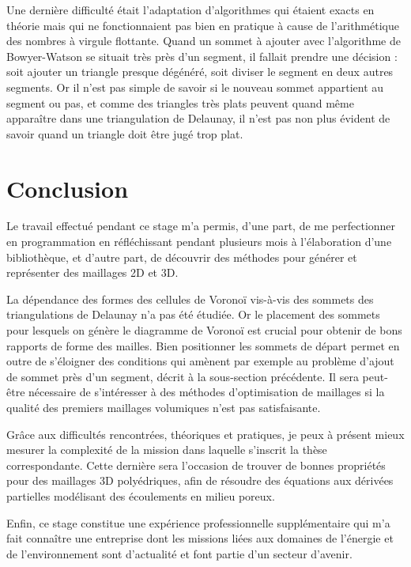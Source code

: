 \documentclass[12pt,a4paper]{report}
\begin{document}
Une dernière difficulté était l'adaptation d'algorithmes qui étaient exacts en théorie mais qui ne fonctionnaient pas bien en pratique à cause de l'arithmétique des nombres à virgule flottante. Quand un sommet à ajouter avec l'algorithme de Bowyer-Watson se situait très près d'un segment, il fallait prendre une décision : soit ajouter un triangle presque dégénéré, soit diviser le segment en deux autres segments. Or il n'est pas simple de savoir si le nouveau sommet appartient au segment ou pas, et comme des triangles très plats peuvent quand même apparaître dans une triangulation de Delaunay, il n'est pas non plus évident de savoir quand un triangle doit être jugé \og trop plat\fg{}.

\newpage
\section{Conclusion}

Le travail effectué pendant ce stage m'a permis, d'une part, de me perfectionner en programmation en réfléchissant pendant plusieurs mois à l'élaboration d'une bibliothèque, et d'autre part, de découvrir des méthodes pour générer et représenter des maillages 2D et 3D.

La dépendance des formes des cellules de Voronoï vis-à-vis des sommets des triangulations de Delaunay n'a pas été étudiée. Or le placement des sommets pour lesquels on génère le diagramme de Voronoï est crucial pour obtenir de bons rapports de forme des mailles. Bien positionner les sommets de départ permet en outre de s'éloigner des conditions qui amènent par exemple au problème d'ajout de sommet près d'un segment, décrit à la sous-section précédente. Il sera peut-être nécessaire de s'intéresser à des méthodes d'optimisation de maillages si la qualité des premiers maillages volumiques n'est pas satisfaisante.

Grâce aux difficultés rencontrées, théoriques et pratiques, je peux à présent mieux mesurer la complexité de la mission dans laquelle s'inscrit la thèse correspondante. Cette dernière sera l'occasion de trouver de bonnes propriétés pour des maillages 3D polyédriques, afin de résoudre des équations aux dérivées partielles modélisant des écoulements en milieu poreux.

Enfin, ce stage constitue une expérience professionnelle supplémentaire qui m'a fait connaître une entreprise dont les missions liées aux domaines de l'énergie et de l'environnement sont d'actualité et font partie d'un secteur d'avenir.
\end{document}
